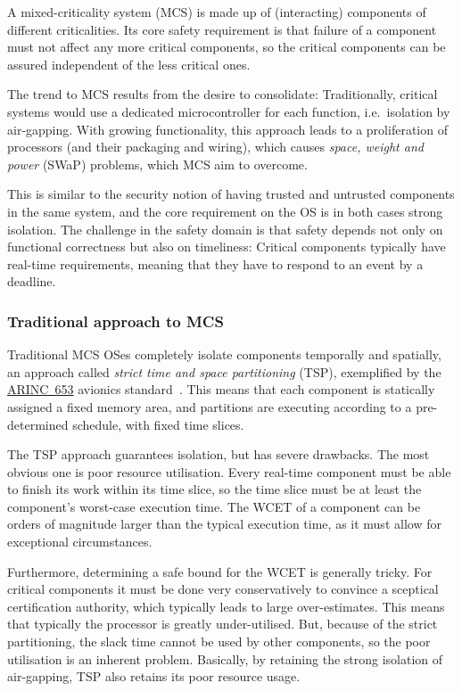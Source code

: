 \documentclass[english,a4paper,12pt]{report}
\newcommand{\SSSect}[1]{\subsubsection*{#1}}
\newcommand{\SSSect}[1]{\subsection*{#1}}
\begin{document}
  A mixed-criticality system (MCS) is made up of (interacting)
  components of different criticalities. Its core safety requirement
  is that failure of a component must not affect any more critical
  components, so the critical components can be assured independent of
  the less critical ones.

  The trend to MCS results from the desire to consolidate:
  Traditionally, critical systems would use a dedicated
  microcontroller for each function, i.e.\ isolation by air-gapping.
  With growing functionality, this approach leads to a proliferation
  of processors (and their packaging and wiring), which causes \emph{space,
  weight and power} (SWaP) problems, which MCS aim to overcome.

  This is similar to the security notion of having trusted and
  untrusted components in the same system, and the core requirement on
  the OS is in both cases strong isolation. The challenge in the
  safety domain is that safety depends not only on functional
  correctness but also on timeliness: Critical components typically
  have real-time requirements, meaning that they have to respond to an
  event by a deadline.

  \SSSect{Traditional approach to MCS}

  Traditional MCS OSes completely isolate components temporally and
  spatially, an approach called \emph{strict time and space
    partitioning} (TSP), exemplified by the
  \href{https://en.wikipedia.org/wiki/ARINC_653}{ARINC~653} avionics
  standard~\citep{ARINC653_12}. This means that each component is
  statically assigned a fixed memory area, and partitions are
  executing according to a pre-determined schedule, with fixed time
  slices.

  The TSP approach guarantees isolation, but has severe drawbacks. The
  most obvious one is poor resource utilisation. Every real-time component must
  be able to finish its work within its time slice, so the time slice
  must be at least the component's worst-case execution time.
  The WCET of a component can be orders of magnitude larger
  than the typical execution time, as it must allow for exceptional circumstances.

  Furthermore, determining a safe bound for the WCET is generally
  tricky. For critical components it must be done very conservatively
  to convince a sceptical certification authority, which typically
  leads to large over-estimates. This means that typically the
  processor is greatly under-utilised. But, because of the strict
  partitioning, the slack time cannot be used by other components, so
  the poor utilisation is an inherent problem. Basically, by retaining
  the strong isolation of air-gapping, TSP also retains its poor
  resource usage.
\end{document}
